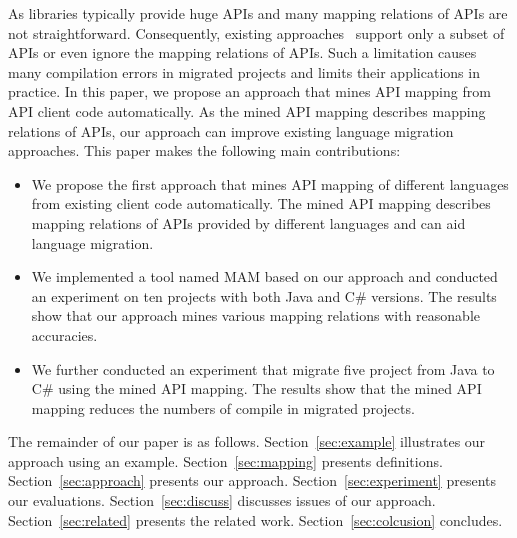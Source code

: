 As libraries typically provide huge APIs and many mapping relations
of APIs are not straightforward. Consequently, existing
approaches~\cite{mossienko2003automated,yasumatsu1995spice,hainaut2008migration}
support only a subset of APIs or even ignore the mapping relations
of APIs. Such a limitation causes many compilation errors in
migrated projects and limits their applications in practice. In this
paper, we propose an approach that mines API mapping from API client
code automatically. As the mined API mapping describes mapping
relations of APIs, our approach can improve existing language
migration approaches. This paper makes the following main
contributions:

\begin{itemize}\vspace*{-1.5ex}
\item We propose the first approach that mines API mapping of
different languages from existing client code automatically. The
mined API mapping describes mapping relations of APIs provided by
different languages and can aid language migration.\vspace*{-1.5ex}
\item We
implemented a tool named MAM based on our approach and conducted an
experiment on ten projects with both Java and C\# versions. The
results show that our approach mines various mapping relations with
reasonable accuracies. \vspace*{-1.5ex}
\item We further conducted an experiment that migrate five project
from Java to C\# using the mined API mapping. The results show that
the mined API mapping reduces the numbers of compile in migrated
projects.
\end{itemize}\vspace*{-1.5ex}


The remainder of our paper is as follows. Section~\ref{sec:example}
illustrates our approach using an example. Section~\ref{sec:mapping}
presents definitions. Section~\ref{sec:approach} presents our
approach. Section~\ref{sec:experiment} presents our evaluations.
Section~\ref{sec:discuss} discusses issues of our approach.
Section~\ref{sec:related} presents the related work.
Section~\ref{sec:colcusion} concludes.
